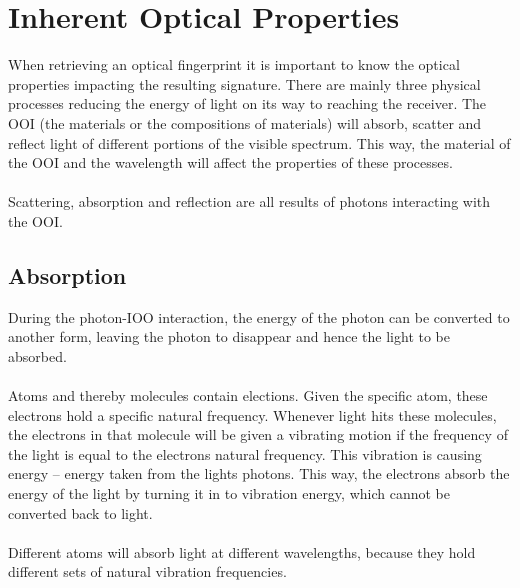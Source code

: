 \section{Inherent Optical Properties}
When retrieving an optical fingerprint it is important to know the optical properties impacting the resulting signature. There are mainly three physical processes reducing the energy of light on its way to reaching the receiver. The OOI (the materials or the compositions of materials) will absorb, scatter and reflect light of different portions of the visible spectrum. This way, the material of the OOI and the wavelength will affect the properties of these processes. 
\\\\
Scattering, absorption and reflection are all results of photons interacting with the OOI. 
\subsection{Absorption} \label{sec:abs}
During the photon-IOO interaction, the energy of the photon can be converted to another form, leaving the photon to disappear and hence the light to be absorbed. 
\\\\
Atoms and thereby molecules contain elections. Given the specific atom, these electrons hold a specific natural frequency. Whenever light hits these molecules, the electrons in that molecule will be given a vibrating motion if the frequency of the light is equal to the electrons natural frequency. This vibration is causing energy – energy taken from the lights photons. This way, the electrons absorb the energy of the light by turning it in to vibration energy, which cannot be converted back to light. 
\\\\
Different atoms will absorb light at different wavelengths, because they hold different sets of natural vibration frequencies. 


